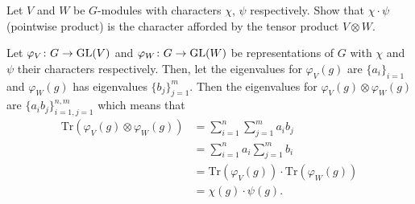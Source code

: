 \documentclass[leqno]{article}
\begin{document}
\newpage
\begin{problem}
Let $V$ and $W$ be $G$-modules with characters $\chi$, $\psi$ respectively. Show that $\chi \cdot \psi$ (pointwise product) is the character afforded by the tensor product $V \otimes W$.
\end{problem}
\begin{solution}
Let $\varphi_V\colon G \to \mathrm{GL}(V)$ and $\varphi_W \colon G \to \mathrm{GL}(W)$ be representations of $G$ with $\chi$ and $\psi$ their characters respectively. Then, let the eigenvalues for $\varphi_V(g)$ are $\{a_i\}_{i=1}$ and $\varphi_W(g)$ has eigenvalues $\{b_j\}_{j=1}^m$. Then the eigenvalues for $\varphi_V(g) \otimes \varphi_W(g)$ are $\{a_i b_j\}_{i=1,j=1}^{n,m}$ which means that
\begin{align*}
    \mathrm{Tr}(\varphi_V(g)\otimes \varphi_W(g))&= \sum_{i=1}^n \sum_{j=1}^m a_ib_j\\
    &= \sum_{i=1}^n a_i \sum_{j=1}^m b_i\\
    &= \mathrm{Tr}(\varphi_V(g))\cdot \mathrm{Tr}(\varphi_W(g))\\
    &= \chi(g)\cdot \psi(g).
\end{align*}
\end{solution}
\end{document}
